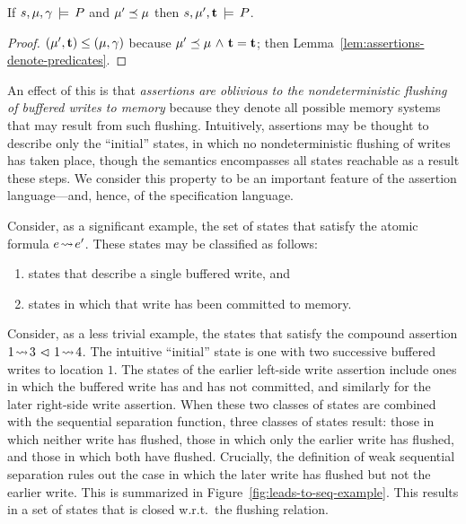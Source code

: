 \documentclass[11pt]{report}
\begin{document}
\begin{corollary}
  If $s,\mu,\gamma \,\models\, P$ and $\mu' \preceq \mu$ then $s,\mu',\mathbf{t} \,\models\, P$. 
\end{corollary}

\begin{proof}
$(\mu',\mathbf{t}) \leq (\mu,\gamma)$ because $\mu' \preceq \mu \operatorname{\,\wedge\,} \mathbf{t} = \mathbf{t}$; then Lemma~\ref{lem:assertions-denote-predicates}. 
\end{proof}

An effect of this is that \emph{assertions are oblivious to the nondeterministic flushing of buffered writes to memory} because they denote all possible memory systems that may result from such flushing. Intuitively, assertions may be thought to describe only the ``initial'' states, in which no nondeterministic flushing of writes has taken place, though the semantics encompasses all states reachable as a result these steps. We consider this property to be an important feature of the assertion language---and, hence, of the specification language. 

Consider, as a significant example, the set of states that satisfy the atomic formula $e \!\leadsto\! e'$. These states may be classified as follows: \begin{enumerate}
    \item states that describe a single buffered write, and 
    \item states in which that write has been committed to memory. 
\end{enumerate} Consider, as a less trivial example, the states that satisfy the compound assertion $1 \!\leadsto\! 3 \operatorname{\,\vartriangleleft\,} 1 \!\leadsto\! 4$. The intuitive ``initial'' state is one with two successive buffered writes to location $1$. The states of the earlier left-side write assertion include ones in which the buffered write has and has not committed, and similarly for the later right-side write assertion. When these two classes of states are combined with the sequential separation function, three classes of states result: those in which neither write has flushed, those in which only the earlier write has flushed, and those in which both have flushed. Crucially, the definition of weak sequential separation rules out the case in which the later write has flushed but not the earlier write. This is summarized in Figure~\ref{fig:leads-to-seq-example}. This results in a set of states that is closed w.r.t.~the flushing relation. 
 
\end{document}

